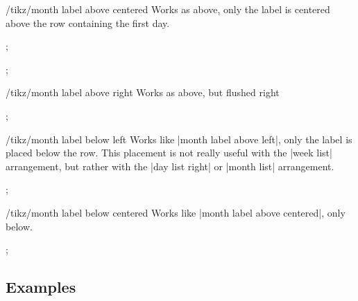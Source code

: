 \begin{stylekey}{/tikz/month label above centered}
    Works as above, only the label is centered above the row containing the
    first day.
\begin{codeexample}[preamble={\usetikzlibrary{calendar}}]
\tikz
  \calendar [dates=2000-02-01 to 2000-02-last,
             day list right,month label above centered];
\end{codeexample}
\begin{codeexample}[preamble={\usetikzlibrary{calendar}}]
\tikz
  \calendar [dates=2000-01-20 to 2000-02-10,
             week list,month label above centered];
\end{codeexample}
\end{stylekey}

\begin{stylekey}{/tikz/month label above right}
    Works as above, but flushed right
\begin{codeexample}[preamble={\usetikzlibrary{calendar}}]
\tikz
  \calendar [dates=2000-01-20 to 2000-02-10,
             week list,month label above right];
\end{codeexample}
\end{stylekey}

\begin{stylekey}{/tikz/month label below left}
    Works like |month label above left|, only the label is placed below the
    row. This placement is not really useful with the |week list| arrangement,
    but rather with the |day list right| or |month list| arrangement.
\begin{codeexample}[preamble={\usetikzlibrary{calendar}}]
\tikz
  \calendar [dates=2000-02-01 to 2000-02-last,
             day list right,month label below left];
\end{codeexample}
\end{stylekey}

\begin{stylekey}{/tikz/month label below centered}
    Works like |month label above centered|, only below.
\begin{codeexample}[preamble={\usetikzlibrary{calendar}}]
\tikz
  \calendar [dates=2000-02-01 to 2000-02-last,
             day list right,month label below centered];
\end{codeexample}
\end{stylekey}


\subsection{Examples}

